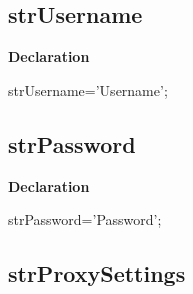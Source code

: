 \documentclass{report}
\newif\ifpdf
\begin{document}
\subsection*{strUsername}
\fi
\label{trstrings-strUsername}
\begin{list}{}{
\setlength{\itemindent}{0cm}
\setlength{\listparindent}{0cm}
\setlength{\leftmargin}{\evensidemargin}
\addtolength{\leftmargin}{\tmplength}
\settowidth{\labelsep}{X}
\addtolength{\leftmargin}{\labelsep}
\setlength{\labelwidth}{\tmplength}
}
\item[\textbf{Declaration}\hfill]
\ifpdf
\begin{flushleft}
\fi
\begin{ttfamily}
strUsername='Username';\end{ttfamily}

\ifpdf
\end{flushleft}
\fi

\end{list}
\ifpdf
\subsection*{\large{\textbf{strPassword}}\normalsize\hspace{1ex}\hrulefill}
\else
\subsection*{strPassword}
\fi
\label{trstrings-strPassword}
\begin{list}{}{
\setlength{\itemindent}{0cm}
\setlength{\listparindent}{0cm}
\setlength{\leftmargin}{\evensidemargin}
\addtolength{\leftmargin}{\tmplength}
\settowidth{\labelsep}{X}
\addtolength{\leftmargin}{\labelsep}
\setlength{\labelwidth}{\tmplength}
}
\item[\textbf{Declaration}\hfill]
\ifpdf
\begin{flushleft}
\fi
\begin{ttfamily}
strPassword='Password';\end{ttfamily}

\ifpdf
\end{flushleft}
\fi

\end{list}
\ifpdf
\subsection*{\large{\textbf{strProxySettings}}\normalsize\hspace{1ex}\hrulefill}
\else
\end{document}
